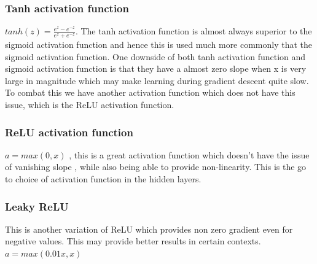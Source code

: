 \documentclass[12pt]{article}
\begin{document}
\subsubsection{Tanh activation function}
$tanh(z) = \frac{e^{z}-e^{-z}}{e^{z}+e^{-z}}$. The tanh activation function is almost always superior to the sigmoid activation function and hence this is used much more commonly that the sigmoid activation function. One downside of both tanh activation function and sigmoid activation function is that they have a almost zero slope when x is very large in magnitude which may make learning during gradient descent quite slow. To combat this we have another activation function which does not have this issue, which is the ReLU activation function.  
\begin{figure}[ht]
\centering
{}
\end{figure}
\subsubsection{ReLU activation function}
$a = max(0,x)$ , this is a great activation function which doesn't have the issue of vanishing slope , while also being able to provide non-linearity. This is the go to choice of activation function in the hidden layers.
\begin{figure}[ht]
\centering
{}
\end{figure}
\subsubsection{Leaky ReLU}
This is another variation of ReLU which provides non zero gradient even for negative values. This may provide better results in certain contexts.\\ 
$a = max(0.01x,x)$ 
\begin{figure}[H] 
\centering
{}
\end{figure}
\end{document}

